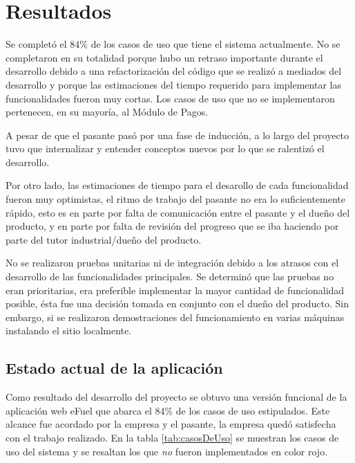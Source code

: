 \chapter{Resultados} \label{results}
Se completó el 84\% de los casos de uso que tiene el sistema actualmente. No se completaron en su totalidad porque hubo un retraso importante durante el desarrollo debido a una refactorización del código que se realizó a mediados del desarrollo y porque las estimaciones del tiempo requerido para implementar las funcionalidades fueron muy cortas. Los casos de uso que no se implementaron pertenecen, en su mayoría, al Módulo de Pagos.

A pesar de que el pasante pasó por una fase de inducción, a lo largo del proyecto tuvo que internalizar y entender conceptos nuevos por lo que se ralentizó el desarrollo.

Por otro lado, las estimaciones de tiempo para el desarollo de cada funcionalidad fueron muy optimistas, el ritmo de trabajo del pasante no era lo suficientemente rápido, esto es en parte por falta de comunicación entre el pasante y el dueño del producto, y en parte por falta de revisión del progreso que se iba haciendo por parte del tutor industrial/dueño del producto.

No se realizaron pruebas unitarias ni de integración debido a los atrasos con el desarrollo de las funcionalidades principales. Se determinó que las pruebas no eran prioritarias, era preferible implementar la mayor cantidad de funcionalidad posible, ésta fue una decisión tomada en conjunto con el dueño del producto. Sin embargo, si se realizaron demostraciones del funcionamiento en varias máquinas instalando el sitio localmente.

\section{Estado actual de la aplicación}
Como resultado del desarrollo del proyecto se obtuvo una versión funcional de la aplicación web eFuel que abarca el 84\% de los casos de uso estipulados. Este alcance fue acordado por la empresa y el pasante, la empresa quedó satisfecha con el trabajo realizado. En la tabla \ref{tab:casosDeUso} se muestran los casos de uso del sistema y se resaltan los que \emph{no} fueron implementados en color rojo.

\newcommand\usecasenumber{\stepcounter{usecasesrownumbers}\arabic{usecasesrownumbers}}

